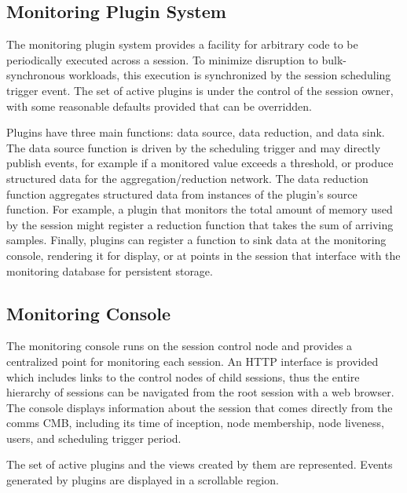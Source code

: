 \subsection{Monitoring Plugin System}

The monitoring plugin system provides a facility for arbitrary code to be
periodically executed across a session.  To minimize disruption to
bulk-synchronous workloads, this execution is synchronized by the 
session scheduling trigger event.  The set of active plugins is
under the control of the session owner, with some reasonable
defaults provided that can be overridden.


Plugins have three main functions: data source, data reduction,
and data sink.  The data source function is driven by the scheduling
trigger and may directly publish events, for example if a monitored
value exceeds a threshold, or produce structured data for the
aggregation/reduction network.
The data reduction function aggregates structured data from instances
of the plugin's source function.
For example, a plugin that monitors the total amount of memory used
by the session might register a reduction function that takes the sum of
arriving samples.
Finally, plugins can register a function to sink data at the monitoring
console, rendering it for display, or at points in the session that interface
with the monitoring database for persistent storage.

\subsection{Monitoring Console}

The monitoring console runs on the session control node and provides
a centralized point for monitoring each session.
An HTTP interface is provided which includes links to the control nodes
of child sessions, thus the entire hierarchy of sessions can be navigated
from the root session with a web browser.
The console displays information about the session that comes directly
from the comms CMB, including its time of inception, node membership,
node liveness, users, and scheduling trigger period.

The set of active plugins and the views created by them are represented.
Events generated by plugins are displayed in a scrollable region.

